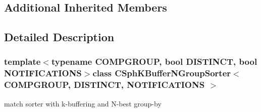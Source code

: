 \subsection*{Additional Inherited Members}


\subsection{Detailed Description}
\subsubsection*{template$<$typename C\-O\-M\-P\-G\-R\-O\-U\-P, bool D\-I\-S\-T\-I\-N\-C\-T, bool N\-O\-T\-I\-F\-I\-C\-A\-T\-I\-O\-N\-S$>$class C\-Sph\-K\-Buffer\-N\-Group\-Sorter$<$ C\-O\-M\-P\-G\-R\-O\-U\-P, D\-I\-S\-T\-I\-N\-C\-T, N\-O\-T\-I\-F\-I\-C\-A\-T\-I\-O\-N\-S $>$}

match sorter with k-\/buffering and N-\/best group-\/by 

